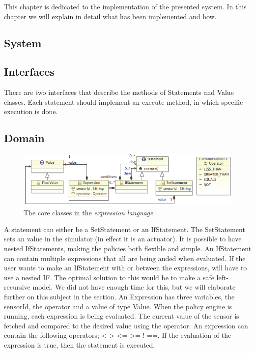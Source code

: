 This chapter is dedicated to the implementation of the presented system. In this chapter we will explain in detail what has been implemented and how. 

\subsection{System}

\subsection{Interfaces}
There are two interfaces that describe the methods of Statements and Value classes. Each statement should implement an execute method, in which specific execution is done. 
\subsection{Domain}
\begin{figure}
	\centering
    \includegraphics[scale=0.55]{chapters/implementation-model-expression-language.png} 
	\caption{The core classes in the \textit{expression language}.}
	\label{fig:ecore-sensors-actuators}
\end{figure}

A statement can either be a SetStatement or an IfStatement. The SetStatement sets an value in the simulator (in effect it is an actuator). It is possible to have nested IfStatements, making the policies both flexible and simple. An IfStatement can contain multiple expressions that all are being anded when evaluated. If the user wants to make an IfStatement with or between the expressions, will have to use a nested IF. The optimal solution to this would be to make a safe left-recursive model. We did not have enough time for this, but we will elaborate further on this subject in the  section. 
An Expression has three variables, the sensorId, the operator and a value of type Value. When the policy engine is running, each expression is being evaluated. The current value of the sensor is fetched and compared to the desired value using the operator. An expression can contain the following operators; < > <= >= ! ==. 
If the evaluation of the expression is true, then the statement is executed.

